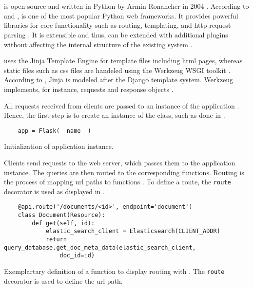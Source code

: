 \section{\flask{}}\label{sec:BE_flask}

\flask{} is open source and written in Python by Armin Ronancher in 2004 \cite{flask2015, mvc_flask2019}.
According to \citeauthor{flask_book2015} and \citeauthor{mvc_flask2019}, \flask{} is one of the most popular Python web frameworks.
It provides powerful libraries for core functionality such as routing, templating, and \ac{http} request parsing \cite{flask_book2015}.
It is extensible and thus, can be extended with additional plugins without affecting the internal structure of the existing system \cite{flask2015}.

\flask{} uses the Jinja Template Engine for template files including \ac{html} pages,
whereas static files such as \ac{css} files are handeled using the Werkzeug WSGI toolkit \cite{flask2015}.
According to \citeauthor{flask2015}, Jinja is modeled after the Django template system.
Werkzeug implements, for instance, requests and response objects \cite{mvc_flask2019}.

All requests received from clients are passed to an instance of the \flask{} application \cite{flask_book2018}.
Hence, the first step is to create an instance of the \flask{} class, such as done in .

\begin{listing}[htp]
    \begin{verbatim}
    app = Flask(__name__)
    \end{verbatim}
    \caption{Initialization of \flask{} application instance.
    }
    \label{lst:flask_app_init}
\end{listing}

Clients send requests to the web server, which passes them to the \flask{} application instance.
The queries are then routed to the corresponding functions.
Routing is the process of mapping \ac{url} paths to functions \cite{flask_book2018}.
To define a route, the \texttt{route} decorator is used as displayed in .

\begin{listing}[htp]
    \begin{verbatim}
    @api.route('/documents/<id>', endpoint='document')
    class Document(Resource):
        def get(self, id):
            elastic_search_client = Elasticsearch(CLIENT_ADDR)
            return query_database.get_doc_meta_data(elastic_search_client, 
                doc_id=id)
    \end{verbatim}
    \caption{Exemplartary definition of a function to display routing with \flask{}.
    The \texttt{route} decorator is used to define the \ac{url} path.
    }
    \label{lst:flask_routing}
\end{listing}

